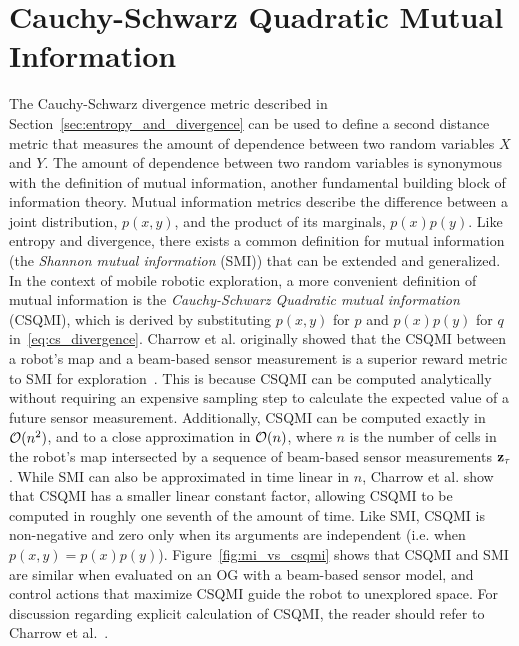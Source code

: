 \section{Cauchy-Schwarz Quadratic Mutual Information}
\label{sec:csqmi}

The Cauchy-Schwarz divergence metric described in Section~\ref{sec:entropy_and_divergence} can be
used to define a second distance metric that measures the amount of dependence
between two random variables $X$ and $Y$. The amount of dependence between two
random variables is synonymous with the definition of mutual information, another
fundamental building block of information theory. Mutual information metrics
describe the difference between a joint distribution, $p(x, y)$, and the product
of its marginals, $p(x)p(y)$. Like entropy and divergence, there exists a common
definition for mutual information (the \textit{Shannon mutual information} (SMI)) that can be
extended and generalized. In the context of mobile robotic exploration, a more convenient
definition of mutual information is the \textit{Cauchy-Schwarz Quadratic mutual
information} (CSQMI), which is derived
by substituting $p(x, y)$ for $p$ and $p(x)p(y)$ for $q$
in~\eqref{eq:cs_divergence}.
%
%
Charrow et al. originally showed that the CSQMI between a robot's map and a beam-based
sensor measurement is a superior reward metric to SMI for
exploration~\cite{charrow2015icra}. This is because CSQMI can be computed
analytically without requiring an expensive sampling step to
calculate the expected value of a future sensor measurement. Additionally,
CSQMI can be computed exactly in $\mathcal{O}(n^2)$, and to a close approximation
in $\mathcal{O}(n)$, where $n$ is the number of cells in the robot's map intersected by a
sequence of beam-based sensor measurements $\mathbf{z}_{\mathbf{\tau}}$. While SMI can also be approximated in time linear in
$n$, Charrow et al. show that CSQMI has a smaller linear constant factor,
allowing CSQMI to be computed in roughly one seventh of the amount of time.
Like SMI, CSQMI is non-negative and zero only when its arguments are independent
(i.e. when $p(x, y) = p(x)p(y)$). Figure~\ref{fig:mi_vs_csqmi} shows that CSQMI and SMI are
similar when evaluated on an OG with a beam-based sensor model, and control actions
that maximize CSQMI guide the robot to unexplored space. For discussion regarding
explicit calculation of CSQMI, the reader should refer to Charrow et al.~\cite{charrow2015icra}.

